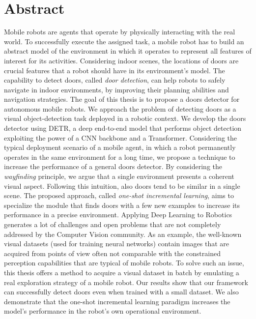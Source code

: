 \newpage
\chapter{Abstract}

Mobile robots are agents that operate by physically interacting with the real world. To successfully execute the assigned task, a mobile robot has to build an abstract model of the environment in which it operates to represent all features of interest for its activities. Considering indoor scenes, the locations of doors are crucial features that a robot should have in its environment's model. The capability to detect doors, called \emph{door detection}, can help robots to safely navigate in indoor environments, by improving their planning abilities and navigation strategies. The goal of this thesis is to propose a doors detector for autonomous mobile robots. We approach the problem of detecting doors as a visual object-detection task deployed in a robotic context. We develop the doors detector using DETR, a deep end-to-end model that performs object detection exploiting the power of a CNN backbone and a Transformer. Considering the typical deployment scenario of a mobile agent, in which a robot permanently operates in the same environment for a long time, we propose a technique to increase the performance of a general doors detector. By considering the \textit{wayfinding} principle, we argue that a single environment presents a coherent visual aspect. Following this intuition, also doors tend to be similar in a single scene. The proposed approach, called \textit{one-shot incremental learning}, aims to specialize the module that finds doors with a few new examples to increase its performance in a precise environment. Applying Deep Learning to Robotics generates a lot of challenges and open problems that are not completely addressed by the Computer Vision community. As an example, the well-known visual datasets (used for training neural networks) contain images that are acquired from points of view often not comparable with the constrained perception capabilities that are typical of mobile robots. To solve such an issue, this thesis offers a method to acquire a visual dataset in batch by emulating a real exploration strategy of a mobile robot. Our results show that our framework can successfully detect doors even when trained with a small dataset. We also demonstrate that the one-shot incremental learning paradigm increases the model's performance in the robot's own operational environment.

